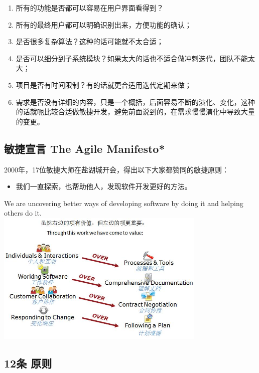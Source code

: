\begin{enumerate}
\tightlist
\item
  所有的功能是否都可以容易在用户界面看得到？
\item
  所有的最终用户都可以明确识别出来，方便功能的确认；
\item
  是否很多复杂算法？这种的话可能就不太合适；
\item
  是否可以细分到子系统模块？如果太大的话也不适合做冲刺迭代，团队不能太大；
\item
  项目是否有时间限制？有的话就更合适用迭代定期来做；
\item
  需求是否没有详细的内容，只是一个概括，后面容易不断的演化、变化，这种的话就呃比较合适做敏捷开发，避免前面说到的，在需求慢慢演化中导致大量的变更。\\
\end{enumerate}

\hypertarget{ux654fux6377ux5ba3ux8a00-the-agile-manifesto}{%
\subsection{敏捷宣言 The Agile
Manifesto*}\label{ux654fux6377ux5ba3ux8a00-the-agile-manifesto}}

2000年，17位敏捷大师在盐湖城开会，得出以下大家都赞同的敏捷原则：

\begin{itemize}
\tightlist
\item
  我们一直探索，也帮助他人，发现软件开发更好的方法。
\end{itemize}

We are uncovering better ways of developing software by doing it and
helping others do it.\\

\includegraphics[width=10cm]{P6The_Agile_Manifesto.jpg}

\hypertarget{ux6761-ux539fux5219}{%
\subsection{12条 原则}\label{ux6761-ux539fux5219}}

